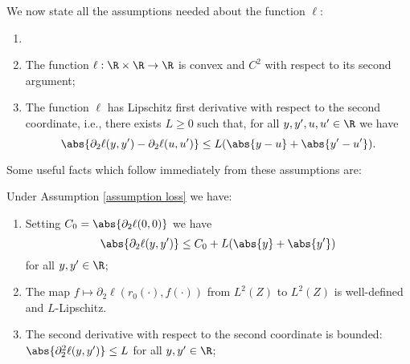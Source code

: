 We now state all the assumptions needed about the function $ \ell $:
\begin{assumption}
    \label{assumption loss}
    \begin{enumerate}
        \item[]
        \item The function $ \ell : \R \times \R \to \R $ is convex and $ C^2 $ with respect to its second argument;
        \item The function $ \ell $ has Lipschitz first derivative with respect to the second coordinate, i.e., there exists $ L \geq 0 $ such that, for all $ y, y', u, u' \in \R $ we have
            \begin{equation*}
                \abs{ \partial_{ 2 } \ell ( y, y' ) - \partial_{ 2 } \ell ( u, u' ) }
                \leq L ( \abs{ y - u } + \abs{ y' - u' } )
            .\end{equation*}
            \label{en: lipschitz gradients}
    \end{enumerate}
\end{assumption}
Some useful facts which follow immediately from these assumptions are:
\begin{proposition}
    \label{prop: loss properties}
    Under Assumption \ref{assumption loss} we have:
    \begin{enumerate}
        \item \label{bounded growth} Setting $ C_{ 0 } = \abs{ \partial_{ 2 } \ell ( 0, 0 ) } $ we have
            \begin{equation*}
                \abs{ \partial_{ 2 } \ell ( y, y' ) } \leq C_{ 0 } + L ( \abs{ y } + \abs{ y' } )
            \end{equation*}
            for all $ y, y' \in \R $;
        \item \label{continuous composition} The map $ f \mapsto \partial_{ 2 } \ell ( r_{ 0 } ( \cdot ), f ( \cdot ) ) $ from $ L^{ 2 } ( Z ) $ to $ L^{ 2 } ( Z ) $ is well-defined and $ L $-Lipschitz.
        \item \label{bounded second derivative} The second derivative with respect to the second coordinate is bounded: $ \abs{ \partial_{ 2 }^{ 2 } \ell ( y, y' ) } \leq L $ for all $ y, y' \in \R $;
    \end{enumerate}
\end{proposition}
